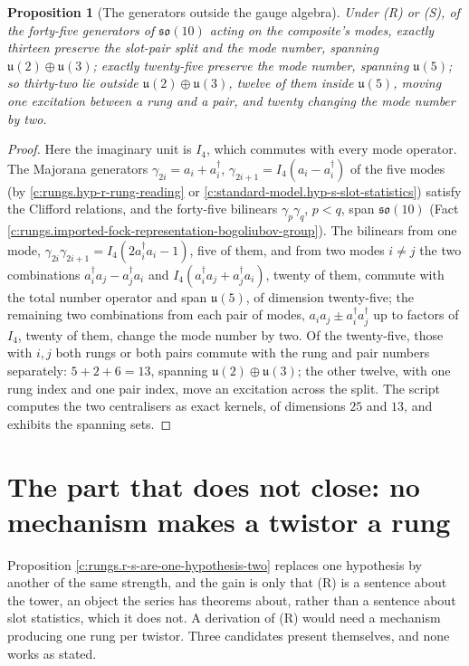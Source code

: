 \documentclass[11pt]{article}
\newtheorem{proposition}[theorem]{Proposition}
\theoremstyle{definition}
\theoremstyle{plain}
\providecommand{\uu}{}\renewcommand{\uu}{\mathfrak{u}}
\begin{document}
\begin{proposition}[The generators outside the gauge algebra]\label{c:rungs.generators-outside-gauge-algebra}
Under (R) or (S), of the forty-five generators of $\mathfrak{so}(10)$ acting on the composite's modes, exactly thirteen preserve the slot-pair split and the mode number, spanning $\uu(2) \oplus \uu(3)$; exactly twenty-five preserve the mode number, spanning $\uu(5)$; so thirty-two lie outside $\uu(2) \oplus \uu(3)$, twelve of them inside $\uu(5)$, moving one excitation between a rung and a pair, and twenty changing the mode number by two.
\end{proposition}
\begin{proof}
Here the imaginary unit is $I_{4}$, which commutes with every mode operator. The Majorana generators $\gamma_{2i} = a_{i} + a_{i}^{\dagger}$, $\gamma_{2i+1} = I_{4}(a_{i} - a_{i}^{\dagger})$ of the five modes (by \ref{c:rungs.hyp-r-rung-reading} or \ref{c:standard-model.hyp-s-slot-statistics}) satisfy the Clifford relations, and the forty-five bilinears $\gamma_{p}\gamma_{q}$, $p < q$, span $\mathfrak{so}(10)$ (Fact \ref{c:rungs.imported-fock-representation-bogoliubov-group}). The bilinears from one mode, $\gamma_{2i}\gamma_{2i+1} = I_{4}(2a_{i}^{\dagger}a_{i} - 1)$, five of them, and from two modes $i \neq j$ the two combinations $a_{i}^{\dagger}a_{j} - a_{j}^{\dagger}a_{i}$ and $I_{4}(a_{i}^{\dagger}a_{j} + a_{j}^{\dagger}a_{i})$, twenty of them, commute with the total number operator and span $\uu(5)$, of dimension twenty-five; the remaining two combinations from each pair of modes, $a_{i}a_{j} \pm a_{i}^{\dagger}a_{j}^{\dagger}$ up to factors of $I_{4}$, twenty of them, change the mode number by two. Of the twenty-five, those with $i, j$ both rungs or both pairs commute with the rung and pair numbers separately: $5 + 2 + 6 = 13$, spanning $\uu(2) \oplus \uu(3)$; the other twelve, with one rung index and one pair index, move an excitation across the split. The script computes the two centralisers as exact kernels, of dimensions $25$ and $13$, and exhibits the spanning sets.

\end{proof}

\section{The part that does not close: no mechanism makes a twistor a rung}

\label{c:note.rungs.setting-part-does-not-close-no}
Proposition \ref{c:rungs.r-s-are-one-hypothesis-two} replaces one hypothesis by another of the same strength, and the gain is only that (R) is a sentence about the tower, an object the series has theorems about, rather than a sentence about slot statistics, which it does not. A derivation of (R) would need a mechanism producing one rung per twistor. Three candidates present themselves, and none works as stated.
\end{document}
